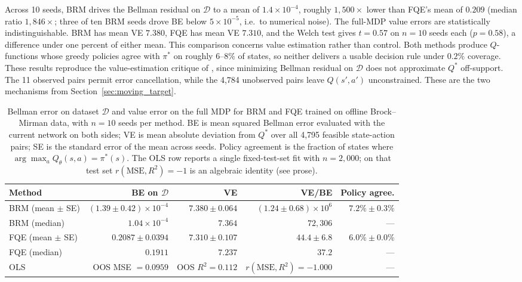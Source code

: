 Across 10 seeds, BRM drives the Bellman residual on $\mathcal{D}$ to a mean of $1.4 \times 10^{-4}$, roughly $1{,}500\times$ lower than FQE's mean of $0.209$ (median ratio $1{,}846\times$; three of ten BRM seeds drove BE below $5 \times 10^{-5}$, i.e.\ to numerical noise). The full-MDP value errors are statistically indistinguishable. BRM has mean VE $7.380$, FQE has mean VE $7.310$, and the Welch test gives $t = 0.57$ on $n=10$ seeds each ($p = 0.58$), a difference under one percent of either mean. This comparison concerns value estimation rather than control. Both methods produce $Q$-functions whose greedy policies agree with $\pi^*$ on roughly $6$--$8\%$ of states, so neither delivers a usable decision rule under $0.2\%$ coverage. These results reproduce the value-estimation critique of \citet{Fujimoto2022}, since minimizing Bellman residual on $\mathcal{D}$ does not approximate $Q^*$ off-support. The 11 observed pairs permit error cancellation, while the 4,784 unobserved pairs leave $Q(s',a')$ unconstrained. These are the two mechanisms from Section~\ref{sec:moving_target}.

\begin{table}[h]
\centering
\small
\begin{tabular}{@{}lrrrr@{}}
\toprule
Method & BE on $\mathcal{D}$ & VE & VE/BE & Policy agree. \\
\midrule
BRM (mean $\pm$ SE)   & $(1.39 \pm 0.42) \times 10^{-4}$ & $7.380 \pm 0.064$ & $(1.24 \pm 0.68) \times 10^{6}$ & $7.2\% \pm 0.3\%$ \\
BRM (median)          & $1.04 \times 10^{-4}$            & $7.364$           & $72{,}306$                 & --- \\
FQE (mean $\pm$ SE)   & $0.2087 \pm 0.0394$              & $7.310 \pm 0.107$ & $44.4 \pm 6.8$             & $6.0\% \pm 0.0\%$ \\
FQE (median)          & $0.1911$                          & $7.237$           & $37.2$                     & --- \\
\midrule
OLS & OOS MSE $= 0.0959$ & OOS $R^2 = 0.112$ & $r(\mathrm{MSE}, R^2) = -1.000$ & --- \\
\bottomrule
\end{tabular}
\caption{Bellman error on dataset $\mathcal{D}$ and value error on the full MDP for BRM and FQE trained on offline Brock--Mirman data, with $n = 10$ seeds per method. BE is mean squared Bellman error evaluated with the current network on both sides; VE is mean absolute deviation from $Q^*$ over all 4,795 feasible state-action pairs; SE is the standard error of the mean across seeds. Policy agreement is the fraction of states where $\arg\max_a Q_\theta(s,a) = \pi^*(s)$. The OLS row reports a single fixed-test-set fit with $n = 2{,}000$; on that test set $r(\mathrm{MSE}, R^2) = -1$ is an algebraic identity (see prose).}
\label{tab:bellman_sim}
\end{table}

